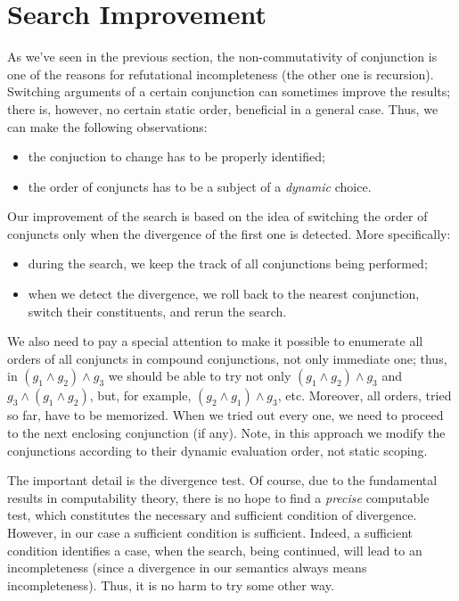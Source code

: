 \section{Search Improvement}
\label{improvement}

As we've seen in the previous section, the non-commutativity of conjunction is one of the reasons for
refutational incompleteness (the other one is recursion). Switching arguments of a certain conjunction
can sometimes improve the results; there is, however, no certain static order,
beneficial in a general case. Thus, we can make the following observations:

\begin{itemize}
\item the conjuction to change has to be properly identified;
\item the order of conjuncts has to be a subject of a \emph{dynamic} choice.
\end{itemize}

Our improvement of the search is based on the idea of switching the order of conjuncts only when
the divergence of the first one is detected. More specifically: 

\begin{itemize}
\item during the search, we keep the track of all conjunctions being performed;
\item when we detect the divergence, we roll back to the nearest conjunction, switch their
constituents, and rerun the search.
\end{itemize}

We also need to pay a special attention to make it possible to enumerate all orders of all conjuncts in
compound conjunctions, not only immediate one; thus, in \mbox{$(g_1\wedge g_2)\wedge g_3$} we should
be able to try not only \mbox{$(g_1\wedge g_2)\wedge g_3$} and \mbox{$g_3 \wedge(g_1\wedge g_2)$}, but, 
for example, \mbox{$(g_2\wedge g_1)\wedge g_3$}, etc. Moreover, all orders, tried so far, have to be
memorized. When we tried out every one, we need to proceed to the next enclosing conjunction (if any).
Note, in this approach we modify the conjunctions according to their dynamic evaluation order, not static
scoping. 

The important detail is the divergence test. Of course, due to the fundamental results in computability
theory, there is no hope to find a \emph{precise} computable test, which constitutes the necessary and 
sufficient condition of divergence. However, in our case a sufficient condition is sufficient. Indeed,  
a sufficient condition identifies a case, when the search, being continued, will lead to an incompleteness 
(since a divergence in our semantics always means incompleteness). Thus, it is no harm to try some other way. 

